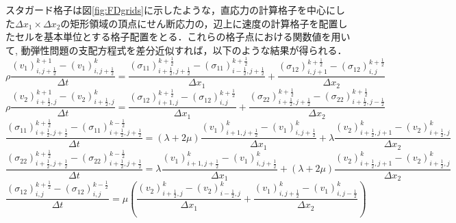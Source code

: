 スタガード格子は図\ref{fig:FDgrids}に示したような，直応力の計算格子を中心にした$\Delta x_1 \times \Delta x_2$の矩形領域の頂点にせん断応力の，辺上に速度の計算格子を配置したセルを基本単位とする格子配置をとる．これらの格子点における関数値を用いて, 動弾性問題の支配方程式を差分近似すれば，以下のような結果が得られる．
\begin{equation}
	\rho \frac{(v_1)_{i,j+\frac{1}{2}}^{k+1}-(v_1)^k_{i,j+\frac{1}{2}}}{\Delta t}
	=
	\frac{ 
		(\sigma_{11})^{k+\frac{1}{2}}_{i+\frac{1}{2},j+\frac{1}{2}}
		-(\sigma_{11})^{k+\frac{1}{2}}_{i-\frac{1}{2},j+\frac{1}{2}} 
	}
	{\Delta x_1}
	+
	\frac{(\sigma_{12})^{k+\frac{1}{2}}_{i,j+1}-(\sigma_{12})^{k+\frac{1}{2}}_{i,j}}{\Delta x_2}
	\label{eqn:fdtd_v1}
\end{equation}
\begin{equation}
	\rho \frac{(v_2)_{i+\frac{1}{2},j}^{k+1}-(v_2)^k_{i+\frac{1}{2},j}}{\Delta t}
	=
	\frac{(\sigma_{12})^{k+\frac{1}{2}}_{i+1,j}-(\sigma_{12})^{k+\frac{1}{2}}_{i,j}}{\Delta x_1}
	+
	\frac{ 
		(\sigma_{22})^{k+\frac{1}{2}}_{i+\frac{1}{2},j+\frac{1}{2}}
		-(\sigma_{22})^{k+\frac{1}{2}}_{i+\frac{1}{2},j-\frac{1}{2}} 
	}
	{\Delta x_2}
	\label{eqn:fdtd_v2}
\end{equation}
\begin{equation}
	\frac{
		 (\sigma_{11})^{k+\frac{1}{2}}_{i+\frac{1}{2},j+\frac{1}{2}}
		-
		 (\sigma_{11})^{k-\frac{1}{2}}_{i+\frac{1}{2},j+\frac{1}{2}}
	}
	{\Delta t}
	=
	\left( \lambda+2\mu \right)
	\frac{
		(v_1)^{k}_{i+1,j+\frac{1}{2}} - (v_1)^{k}_{i,j+\frac{1}{2}} 
	}
	{\Delta x_1}
	+
	\lambda
	\frac{
		(v_2)^{k}_{i+\frac{1}{2}, j+1} - (v_2)^{k}_{i+\frac{1}{2},j} 
	}
	{\Delta x_2}
	\label{eqn:fdtd_s11}
\end{equation}
\begin{equation}
	\frac{
		 (\sigma_{22})^{k+\frac{1}{2}}_{i+\frac{1}{2},j+\frac{1}{2}}
		-
		 (\sigma_{22})^{k-\frac{1}{2}}_{i+\frac{1}{2},j+\frac{1}{2}}
	}
	{\Delta t}
	=
	\lambda
	\frac{
		(v_1)^{k}_{i+1,j+\frac{1}{2}} - (v_1)^{k}_{i,j+\frac{1}{2}} 
	}
	{\Delta x_1}
	+
	\left( \lambda+2\mu \right)
	\frac{
		(v_2)^{k}_{i+\frac{1}{2}, j+1} - (v_2)^{k}_{i+\frac{1}{2},j} 
	}
	{\Delta x_2}
	\label{eqn:fdtd_s22}
\end{equation}
\begin{equation}
	\frac{
		 (\sigma_{12})^{k+\frac{1}{2}}_{i,j}
		-
		 (\sigma_{12})^{k-\frac{1}{2}}_{i,j}
	}
	{\Delta t}
	=
	\mu \left(
		\frac{
			(v_2)^{k}_{i+\frac{1}{2},j}
			-
			(v_2)^{k}_{i-\frac{1}{2},j}
		}
		{\Delta x_1}
		+
		\frac{
			(v_1)^{k}_{i,j+\frac{1}{2}}
			-
			(v_1)^{k}_{i,j-\frac{1}{2}}
		}
		{\Delta x_2}
	\right)	
	\label{eqn:fdtd_s12}
\end{equation}
